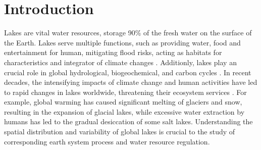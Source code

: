 \documentclass[preprint,12pt,authoryear]{elsarticle}
\begin{document}

\section{Introduction}
\label{sec1}
Lakes are vital water resources, storage 90\% of the fresh water on the surface of the Earth. Lakes serve multiple functions, such as providing water, food and entertainment for human, mitigating flood risks, acting as habitats for characteristics and integrator of climate changes \citep{williamson_lakes_2009,reynaud_global_2017,}. Additionly, lakes play an crucial role in global hydrological, biogeochemical, and carbon cycles \citep{lehner_development_2004,verpoorter_global_2014}. In recent decades, the intensifying impacts of climate change and human activities have led to rapid changes in lakes worldwide, threatening their ecosystem services \citep{pi_mapping_2022}. For example, global warming has caused significant melting of glaciers and snow, resulting in the expansion of glacial lakes\citep{shugar_rapid_2020}, while excessive water extraction by humans has led to the gradual desiccation of some salt lakes\citep{shi_longterm_2014,wurtsbaugh_decline_2017}. Understanding the spatial distribution and variability of global lakes is crucial to the study of corresponding earth system process and water resource regulation. 
\end{document}
